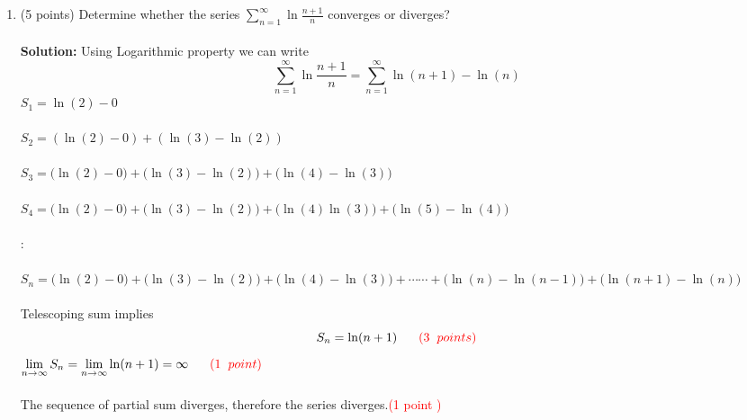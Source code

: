 \documentclass[paper=a4, fontsize=11pt]{scrartcl} %
\newcommand{\ds}{\displaystyle}
\numberwithin{equation}{section} %
\numberwithin{figure}{section} %
\numberwithin{table}{section} %
\begin{document}
\begin{enumerate}
\item (5 points) Determine whether the series $\ds \sum_{n=1}^{\infty}\ds\ln\frac{n+1}{n}$ converges or diverges?\\\\
\textbf{Solution: }  Using Logarithmic property we can write
$$\ds \sum_{n=1}^{\infty}\ds\ln\frac{n+1}{n}=\sum_{n=1}^{\infty}\ln(n+1)-\ln(n)$$
$S_1=\ln(2)-0$\\\\
$S_2=(\ln(2)-0)+(\ln(3)-\ln(2))$\\\\
$S_3=\big(\ln(2)-0\big)+\big(\ln(3)-\ln(2)\big)+\big(\ln(4)-\ln(3)\big)$\\\\
$S_4=\big(\ln(2)-0\big)+\big(\ln(3)-\ln(2)\big)+\big(\ln(4)\ln(3)\big)+\big(\ln(5)-\ln(4)\big)$\\\\
:\\\\
$S_n=\big(\ln(2)-0\big)+\big(\ln(3)-\ln(2)\big)+\big(\ln(4)-\ln(3)\big)+\cdots\cdots+\big(\ln(n)-\ln(n-1)\big)+\big(\ln(n+1)-\ln(n)\big)$\\\\
Telescoping sum implies
$$S_n=\ln(n+1)\hspace{6mm}\textcolor{red}{(3\hspace{2mm} points )}$$
$\lim\limits_{n\rightarrow\infty}S_n=\lim\limits_{n\rightarrow\infty}\ln(n+1)=\infty\hspace{6mm}\textcolor{red}{(1\hspace{2mm} point )}$\\\\
The sequence of partial sum diverges, therefore the series diverges.\hspace{6mm}\textcolor{red}{(1\hspace{2mm} point )}
\newpage


\end{enumerate}
\end{document}
